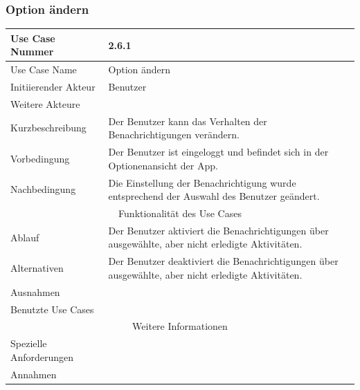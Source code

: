 \documentclass[10pt,a4paper]{article}
\begin{document}
\subsubsection{Option \"andern}
	\begin{tabular}{|l|p{.5\linewidth}|}
	\hline Use Case Nummer & 2.6.1 \\ 
	\hline Use Case Name & Option \"andern \\ 
	\hline Initiierender Akteur & Benutzer \\
	\hline Weitere Akteure &  \\
	\hline Kurzbeschreibung & Der Benutzer kann das Verhalten der Benachrichtigungen verändern. \\
	\hline Vorbedingung & Der Benutzer ist eingeloggt und befindet sich in der Optionenansicht der App. \\
	\hline Nachbedingung & Die Einstellung der Benachrichtigung wurde entsprechend der Auswahl des Benutzer geändert. \\
	\hline \multicolumn{2}{|c|}{Funktionalität des Use Cases}\\
	\hline Ablauf & Der Benutzer aktiviert die Benachrichtigungen über ausgewählte, aber nicht erledigte Aktivitäten. \\
	\hline Alternativen & Der Benutzer deaktiviert die Benachrichtigungen über ausgewählte, aber nicht erledigte Aktivitäten. \\
	\hline Ausnahmen &  \\
	\hline Benutzte Use Cases &  \\
	\hline \multicolumn{2}{|c|}{Weitere Informationen} \\
	\hline Spezielle Anforderungen &  \\
	\hline Annahmen &  \\
	\hline
	\end{tabular}
\end{document}
